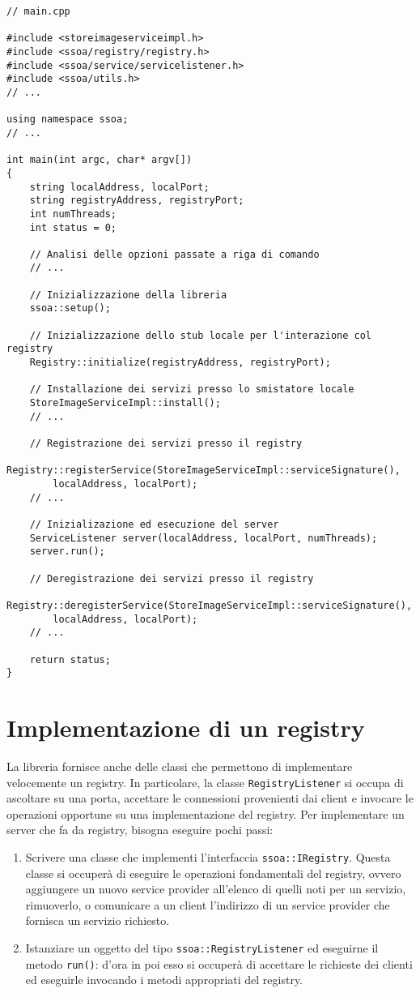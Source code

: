 \documentclass[a4paper,twoside]{article}
\newcommand\code{\lstinline[basicstyle=\normalsize\ttfamily]}
\begin{document}
\begin{lstlisting}
// main.cpp

#include <storeimageserviceimpl.h>
#include <ssoa/registry/registry.h>
#include <ssoa/service/servicelistener.h>
#include <ssoa/utils.h>
// ...

using namespace ssoa;
// ...

int main(int argc, char* argv[])
{
    string localAddress, localPort;
    string registryAddress, registryPort;
    int numThreads;
    int status = 0;

    // Analisi delle opzioni passate a riga di comando
    // ...

    // Inizializzazione della libreria
    ssoa::setup();

    // Inizializzazione dello stub locale per l'interazione col registry
    Registry::initialize(registryAddress, registryPort);

    // Installazione dei servizi presso lo smistatore locale
    StoreImageServiceImpl::install();
    // ...
    
    // Registrazione dei servizi presso il registry
    Registry::registerService(StoreImageServiceImpl::serviceSignature(),
        localAddress, localPort);
    // ...

    // Inizializazione ed esecuzione del server
    ServiceListener server(localAddress, localPort, numThreads);
    server.run();

    // Deregistrazione dei servizi presso il registry
    Registry::deregisterService(StoreImageServiceImpl::serviceSignature(),
        localAddress, localPort);
    // ...

    return status;
}
\end{lstlisting}


\section{Implementazione di un registry}

La libreria fornisce anche delle classi che permettono di implementare velocemente un registry. In particolare, la classe \code|RegistryListener| si occupa di ascoltare su una porta, accettare le connessioni provenienti dai client e invocare le operazioni opportune su una implementazione del registry. Per implementare un server che fa da registry, bisogna eseguire pochi passi:
\begin{enumerate}
\item Scrivere una classe che implementi l'interfaccia \code|ssoa::IRegistry|. Questa classe si occuperà di eseguire le operazioni fondamentali del registry, ovvero aggiungere un nuovo service provider all'elenco di quelli noti per un servizio, rimuoverlo, o comunicare a un client l'indirizzo di un service provider che fornisca un servizio richiesto.
\item Istanziare un oggetto del tipo \code|ssoa::RegistryListener| ed eseguirne il metodo \code|run()|: d'ora in poi esso si occuperà di accettare le richieste dei clienti ed eseguirle invocando i metodi appropriati del registry.
\end{enumerate}
\end{document}
